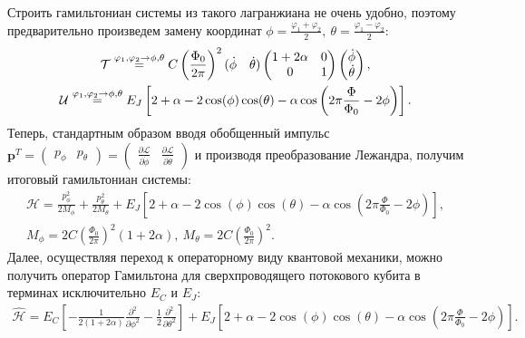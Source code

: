 \documentclass[12pt]{article}
\numberwithin{equation}{section}
\begin{document}
Строить гамильтониан системы из такого лагранжиана не очень удобно, поэтому предварительно произведем замену координат $\displaystyle \phi = \frac{\varphi_1 + \varphi_2}{2},\ \theta = \frac{\varphi_1 - \varphi_2}{2}$:
\begin{gather}
\mathcal{T}  \overset {\varphi_1, \varphi_2 \rightarrow \phi, \theta}{=}
C\left(\frac{\Phi_0}{2\pi}\right)^2 (\begin{matrix}
\dot \phi & \dot \theta
\end{matrix})
\left(\begin{matrix}
1+2\alpha & 0\\
0 & 1
\end{matrix}
\right)
\left(\begin{matrix}
\dot \phi \\ \dot \theta
\end{matrix}\right), \notag
\\
\mathcal{U} \overset {\varphi_1, \varphi_2 \rightarrow \phi, \theta}{=} E_J\left[2+\alpha - 2\cos(\phi)\cos(\theta) - \alpha\cos\left(2\pi\frac{\Phi}{\Phi_0} -2\phi\right)\right].
\label{eq:U_qb}
\end{gather}
Теперь, стандартным образом вводя обобщенный импульс 
$\displaystyle \mathbf{p}^T = \left(\begin{matrix}p_\phi & p_\theta\end{matrix}\right) = \left(\begin{matrix}\frac{\partial\mathcal{L}}{\partial\dot\phi} & \frac{\partial\mathcal{L}}{\partial\dot\theta}\end{matrix}\right)$ и производя преобразование Лежандра, получим итоговый гамильтониан системы:
\begin{gather*}
\mathcal{H} = \frac{p_\phi^2}{2M_\phi} + \frac{p_\theta^2}{2M_\theta}+ E_J\left[2+\alpha - 2\cos(\phi)\cos(\theta) - \alpha\cos\left(2\pi\frac{\Phi}{\Phi_0} -2\phi\right)\right], \\
M_\phi = 2C\left(\frac{\Phi_0}{2\pi}\right)^2(1+2\alpha),\ M_\theta = 2C\left(\frac{\Phi_0}{2\pi}\right)^2.
\end{gather*}
Далее, осуществляя переход к операторному виду квантовой механики, можно получить оператор Гамильтона для сверхпроводящего потокового кубита в терминах исключительно $E_C$ и $E_J$:
\begin{gather}
\hat{\mathcal{H}} = E_C\left[-\frac{1}{2(1 + 2\alpha)}\frac{\partial^2}{\partial\phi^2} 
- \frac{1}{2}\frac{\partial^2}{\partial\theta^2}\right]+ E_J\left[2+\alpha - 2\cos(\phi)\cos(\theta) - \alpha\cos\left(2\pi\frac{\Phi}{\Phi_0} -2\phi \right)\right].
\label{eq:hamiltonian}
\end{gather}
\end{document}
